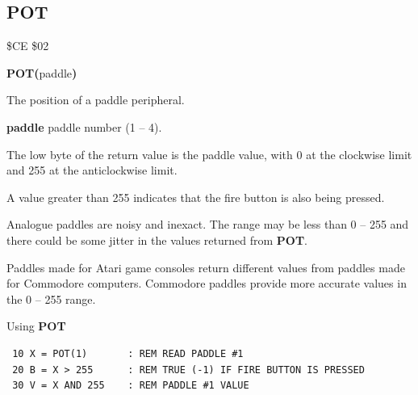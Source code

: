 \subsection{POT}
\begin{description}[leftmargin=2cm,style=nextline]
\item [Token:] \$CE \$02
\item [Format:] {\bf POT(}paddle{\bf)}
\item [Returns:]  The position of a paddle peripheral.

                {\bf paddle} paddle number (1 -- 4).

                The low byte of the return value is the
                paddle value, with 0 at the clockwise limit and 255 at the
                anticlockwise limit.

                A value greater than 255 indicates that the fire button
                is also being pressed.

\item [Remarks:] Analogue paddles are noisy and inexact.
                 The range may be less than 0 -- 255 and there
                 could be some jitter in the values returned from {\bf POT}.

                 Paddles made for Atari game consoles return different values
                 from paddles made for Commodore computers. Commodore paddles provide more accurate values in the 0 -- 255 range.

\item [Example:] Using {\bf POT}

\begin{tcolorbox}[colback=black,coltext=white]
\verbatimfont{\codefont}
\begin{verbatim}
 10 X = POT(1)       : REM READ PADDLE #1
 20 B = X > 255      : REM TRUE (-1) IF FIRE BUTTON IS PRESSED
 30 V = X AND 255    : REM PADDLE #1 VALUE
\end{verbatim}
\end{tcolorbox}
\end{description}


\newpage
